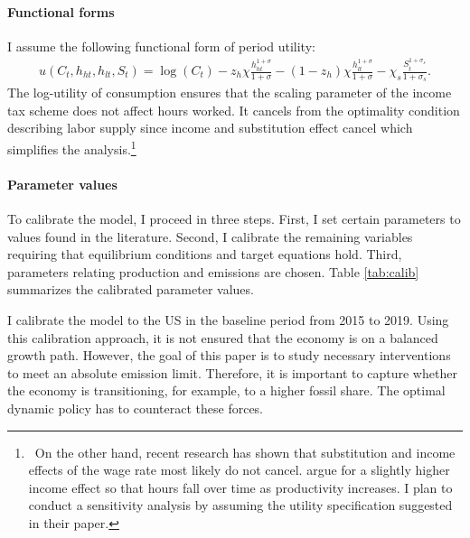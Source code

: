 \paragraph{Functional forms}
 I assume the following functional form of period utility:
\begin{align*}
u(C_t,h_{ht}, h_{lt}, S_t )= \log(C_t)-z_h\chi\frac{h_{ht}^{1+\sigma}}{{1+\sigma}}-(1-z_h)\chi\frac{h_{lt}^{1+\sigma}}{{1+\sigma}}-\chi_s\frac{S_t^{1+\sigma_s}}{1+\sigma_s}.
\end{align*}
 The log-utility of consumption ensures that the scaling parameter of the income tax scheme does not affect hours worked. It cancels from the optimality condition describing labor supply since income and substitution effect cancel which simplifies the analysis.\footnote{\  On the other hand, recent research has shown that substitution and income effects of the wage rate most likely do not cancel. \cite{Boppart2019LaborPerspectiveb} argue for a slightly higher income effect so that hours fall over time as productivity increases. I plan to conduct a sensitivity analysis by assuming the utility specification suggested in their paper.}


\paragraph{Parameter values}
To calibrate the model, I proceed in three steps. First, I set certain parameters to values found in the literature. Second, I calibrate the remaining variables requiring that equilibrium conditions and target equations hold. Third, parameters relating production and emissions are chosen. Table \ref{tab:calib} summarizes the calibrated parameter values.

I calibrate the model to the US in the baseline period from 2015 to 2019. Using this calibration approach, it is not ensured that the economy is on a balanced growth path. However, the goal of this paper is to study necessary interventions to meet an absolute emission limit. Therefore, %
it is important to capture whether the economy is transitioning, for example, to %
a higher fossil share. The optimal dynamic policy has to counteract these forces. %


